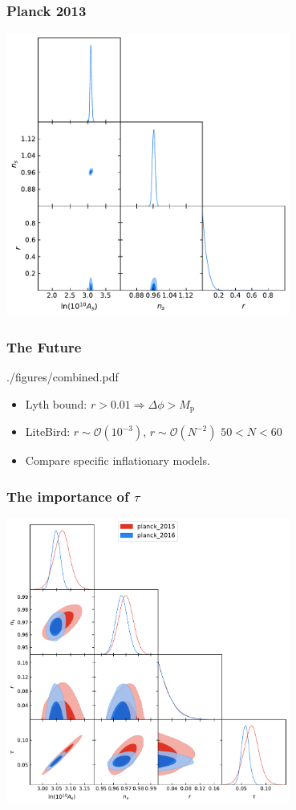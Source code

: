\documentclass[%
]{beamer}
\begin{document}
\begin{frame}
    \frametitle{Planck 2013}
    \centering
    \includegraphics[width=0.7\textwidth]{./figures/planck_2013.pdf}
\end{frame}

\begin{frame}
    \frametitle{The Future}
    \centering
    \begin{figleft}[0.6]{./figures/combined.pdf}
        \begin{itemize}
            \item Lyth bound:  $r>0.01 \Rightarrow \Delta\phi > M_\mathrm{p}$
            \item LiteBird: $r\sim \mathcal{O}(10^{-3})$, $r\sim \mathcal{O}(N^{-2})$ $50<N<60$
            \item Compare specific inflationary models.
        \end{itemize}
    \end{figleft}
\end{frame}


\begin{frame}
    \frametitle{The importance of $\tau$}
    \centering
    \includegraphics[width=0.7\textwidth]{./figures/tau_triangle_both.pdf}
\end{frame}
\end{document}
